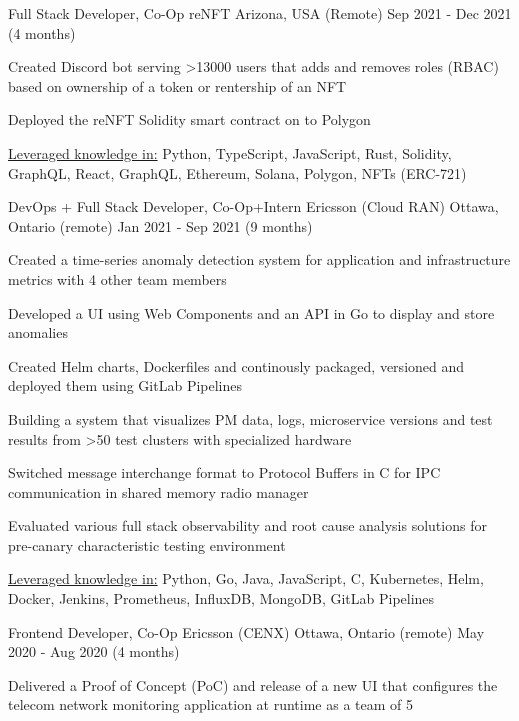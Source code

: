 \begin{cventries}
	\cventry
	{Full Stack Developer, Co-Op}
	{reNFT}
	{Arizona, USA (Remote)}
	{Sep 2021 - Dec 2021 (4 months)}
	{
		\begin{cvitems}
			\item{Created Discord bot serving >13000 users that adds and removes roles (RBAC) based on ownership of a token or rentership of an NFT}
			\item{Deployed the reNFT Solidity smart contract on to Polygon}
			\item{\underline{Leveraged knowledge in:} Python, TypeScript, JavaScript, Rust, Solidity, GraphQL, React, GraphQL, Ethereum, Solana, Polygon, NFTs (ERC-721)}
		\end{cvitems}
	}
	\cventry
	{DevOps + Full Stack Developer, Co-Op+Intern}
	{Ericsson (Cloud RAN)}
	{Ottawa, Ontario (remote)}
	{Jan 2021 - Sep 2021 (9 months)}
	{
		\begin{cvitems}
			\item{Created a time-series anomaly detection system for application and infrastructure metrics with 4 other team members}
			\item{Developed a UI using Web Components and an API in Go to display and store anomalies}
			\item{Created Helm charts, Dockerfiles and continously packaged, versioned and deployed them using GitLab Pipelines}
			\item{Building a system that visualizes PM data, logs, microservice versions and test results from >50 test clusters with specialized hardware}
			\item{Switched message interchange format to Protocol Buffers in C for IPC communication in shared memory radio manager}
			\item{Evaluated various full stack observability and root cause analysis solutions for pre-canary characteristic testing environment}
			\item{\underline{Leveraged knowledge in:} Python, Go, Java, JavaScript, C, Kubernetes, Helm, Docker, Jenkins, Prometheus, InfluxDB, MongoDB, GitLab Pipelines}
		\end{cvitems}
	}
	\cventry
	{Frontend Developer, Co-Op}
	{Ericsson (CENX)}
	{Ottawa, Ontario (remote)}
	{May 2020 - Aug 2020 (4 months)}
	{
		\begin{cvitems}
			\item{Delivered a Proof of Concept (PoC) and release of a new UI that configures the telecom network monitoring application at runtime as a team of 5}

\end{cvitems}}
\end{cventries}
